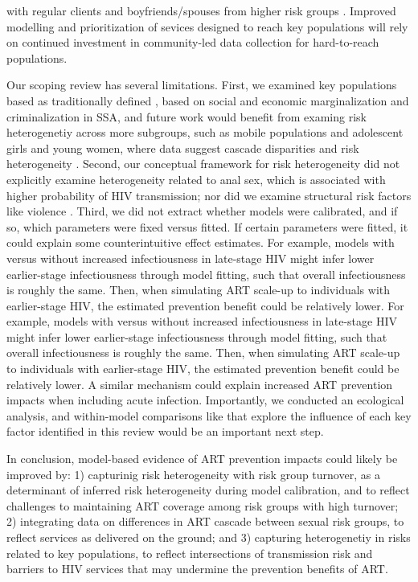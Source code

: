 with regular clients and boyfriends/spouses from higher risk groups \cite{Scorgie2012}.
Improved modelling and prioritization of sevices designed to reach key populations
will rely on continued investment in community-led data collection for hard-to-reach populations.
\par
Our scoping review has several limitations.
First, we examined key populations based as traditionally defined \cite{WHO2016KP},
based on social and economic marginalization and criminalization in SSA,
and future work would benefit from examing risk heterogenetiy across more subgroups,
such as mobile populations and adolescent girls and young women,
where data suggest cascade disparities and risk heterogeneity \cite{Tanser2015,Dellar2015}.
Second, our conceptual framework for risk heterogeneity did not explicitly examine
heterogeneity related to anal sex, which is associated with higher probability of HIV transmission;
nor did we examine structural risk factors like violence \cite{Silverman2011,Baggaley2013}.
Third, we did not extract whether models were calibrated,
and if so, which parameters were fixed versus fitted.
If certain parameters were fitted, it could explain some counterintuitive effect estimates.
For example, models with versus without increased infectiousness in late-stage HIV
might infer lower earlier-stage infectiousness through model fitting,
such that overall infectiousness is roughly the same.
Then, when simulating ART scale-up to individuals with earlier-stage HIV,
the estimated prevention benefit could be relatively lower.
For example, models with versus without increased infectiousness in late-stage HIV
might infer lower earlier-stage infectiousness through model fitting,
such that overall infectiousness is roughly the same.
Then, when simulating ART scale-up to individuals with earlier-stage HIV,
the estimated prevention benefit could be relatively lower.
A similar mechanism could explain increased ART prevention impacts when including acute infection.
Importantly, we conducted an ecological analysis,
and within-model comparisons like \cite{Dodd2010,Hontelez2013} that explore
the influence of each key factor identified in this review would be an important next step.
\par
In conclusion, model-based evidence of ART prevention impacts could likely be improved by:
1) capturinig risk heterogeneity with risk group turnover,
   as a determinant of inferred risk heterogeneity during model calibration, and
   to reflect challenges to maintaining ART coverage among risk groups with high turnover;
2) integrating data on differences in ART cascade between sexual risk groups,
   to reflect services as delivered on the ground; and
3) capturing heterogenetiy in risks related to key populations,
   to reflect intersections of transmission risk and barriers to HIV services
   that may undermine the prevention benefits of ART.